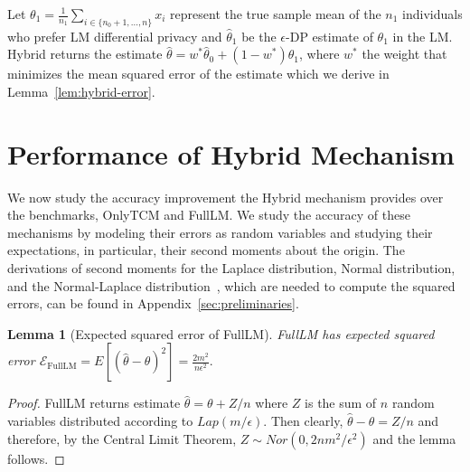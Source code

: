 \documentclass{article}
\theoremstyle{plain}
\newtheorem{lem}[thm]{Lemma}
\begin{document}
Let $\theta_1 = \frac{1}{n_1}\sum_{i \in \{n_0+1, \dots, n\}} x_i$ represent the true sample mean of the $n_1$ individuals who prefer LM differential privacy and $\hat{\theta}_1$ be the $\epsilon$-DP estimate of $\theta_1$ in the LM. %
Hybrid returns the estimate $\hat{\theta} = w^*\hat{\theta}_0 + (1-w^*)\hat{\theta}_1$, where $w^*$ the weight that minimizes the mean squared error of the estimate which we derive in Lemma~\ref{lem:hybrid-error}.





\section{Performance of Hybrid Mechanism}\label{sec:performance}
We now study the accuracy improvement the Hybrid mechanism provides over the benchmarks, OnlyTCM and FullLM. We study the accuracy of these mechanisms by modeling their errors as random variables and studying their expectations, in particular, their second moments about the origin. The derivations of second moments for the Laplace distribution, Normal distribution, and the Normal-Laplace distribution~\cite{Reed2006}, which are needed to compute the squared errors, can be found in Appendix~\ref{sec:preliminaries}.

\begin{lem}[Expected squared error of FullLM]
\label{MSE_FullLM}
FullLM has expected squared error
$\mathcal{E}_{\text{FullLM}} = E[(\hat{\theta} - \theta)^2] = \frac{2m^2}{n\epsilon^2}.$
\end{lem}
\begin{proof}
FullLM returns estimate $\hat{\theta} = \theta + Z/n$ where $Z$ is the sum of $n$ random variables distributed according to $Lap(m/\epsilon)$. Then clearly, $\hat{\theta} - \theta = Z/n$ and therefore, by the Central Limit Theorem, $Z \sim Nor(0, 2nm^2/\epsilon^2)$ and the lemma follows. 
\end{proof}
\end{document}
